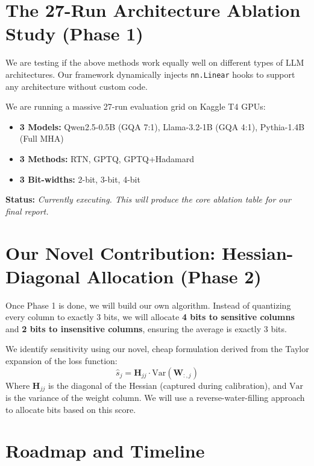 \documentclass[12pt, a4paper]{article}
\begin{document}
\section{The 27-Run Architecture Ablation Study (Phase 1)}
We are testing if the above methods work equally well on different types of LLM architectures. Our framework dynamically injects \texttt{nn.Linear} hooks to support any architecture without custom code.

We are running a massive 27-run evaluation grid on Kaggle T4 GPUs:
\begin{itemize}
    \item \textbf{3 Models:} Qwen2.5-0.5B (GQA 7:1), Llama-3.2-1B (GQA 4:1), Pythia-1.4B (Full MHA)
    \item \textbf{3 Methods:} RTN, GPTQ, GPTQ+Hadamard
    \item \textbf{3 Bit-widths:} 2-bit, 3-bit, 4-bit
\end{itemize}
\textbf{Status:} \textit{Currently executing. This will produce the core ablation table for our final report.}

\section{Our Novel Contribution: Hessian-Diagonal Allocation (Phase 2)}
Once Phase 1 is done, we will build our own algorithm. Instead of quantizing every column to exactly 3 bits, we will allocate \textbf{4 bits to sensitive columns} and \textbf{2 bits to insensitive columns}, ensuring the average is exactly 3 bits.

We identify sensitivity using our novel, cheap formulation derived from the Taylor expansion of the loss function:
\begin{equation}
    \hat{s}_j = \mathbf{H}_{jj} \cdot \mathrm{Var}(\mathbf{W}_{:,j})
\end{equation}
Where $\mathbf{H}_{jj}$ is the diagonal of the Hessian (captured during calibration), and $\mathrm{Var}$ is the variance of the weight column. We will use a reverse-water-filling approach to allocate bits based on this score.

\section{Roadmap and Timeline}
\end{document}
